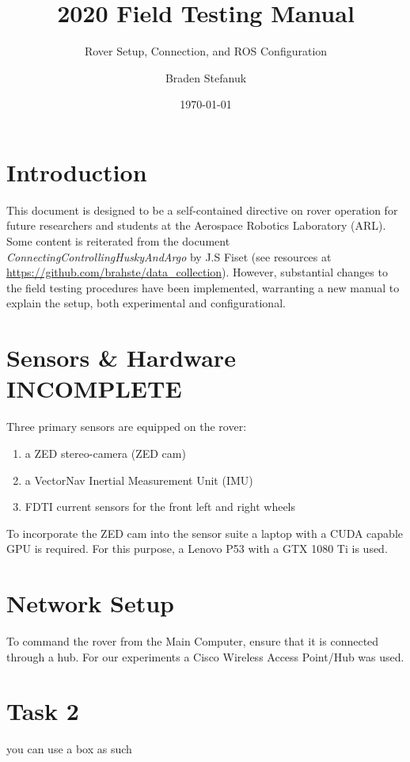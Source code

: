 \documentclass[
	12pt, %
]{fphw}
\title{2020 Field Testing Manual} %
\subtitle{Rover Setup, Connection, and ROS Configuration}
\author{Braden Stefanuk} %
\date{\today} %
\institute{Areospace Robotics Laboratory} %
\begin{document}
\maketitle %


\section{Introduction}

This document is designed to be a self-contained directive on rover operation for future researchers and students at the Aerospace Robotics Laboratory (ARL). Some content is reiterated from the document \textit{ConnectingControllingHuskyAndArgo} by J.S Fiset (see resources at \url{https://github.com/brahste/data_collection}). However, substantial changes to the field testing procedures have been implemented, warranting a new manual to explain the setup, both experimental and configurational.


\section{Sensors \& Hardware INCOMPLETE} 

Three primary sensors are equipped on the rover:
\begin{enumerate}
\item a ZED stereo-camera (ZED cam)
\item a VectorNav Inertial Measurement Unit (IMU)
\item FDTI current sensors for the front left and right wheels
\end{enumerate}
To incorporate the ZED cam into the sensor suite a laptop with a CUDA capable GPU is required. For this purpose, a Lenovo P53 with a GTX 1080 Ti is used.


\section{Network Setup}

To command the rover from the Main Computer, ensure that it is connected through a hub. For our experiments a Cisco Wireless Access Point/Hub was used.


\section*{Task 2}

\begin{problem}
you can use a box as such
\end{problem}
\end{document}
